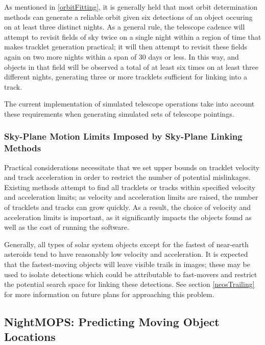 \documentclass[12pt,preprint]{aastex}
\begin{document}
As mentioned in \ref{orbitFitting}, it is generally held that most
orbit determination methods can generate a reliable orbit given six
detections of an object occuring on at least three distinct nights.
As a general rule, the telescope cadence will attempt to revisit
fields of sky twice on a single night within a region of time that
makes tracklet generation practical; it will then attempt to revisit
these fields again on two more nights within a span of 30 days or
less.  In this way, and objects in that field will be observed a total
of at least six times on at least three different nights, generating
three or more tracklets sufficient for linking into a track.


The current implementation of simulated telescope operations
take into account these requirements when generating simulated sets of
telescope pointings. 


\subsubsection{Sky-Plane Motion Limits Imposed by Sky-Plane Linking Methods}

Practical considerations necessitate that we set upper bounds on
tracklet velocity and track acceleration in order to restrict the
number of potential mislinkages. Existing methods attempt to find all
tracklets or tracks within specified velocity and acceleration limits;
as velocity and acceleration limits are raised, the number of
tracklets and tracks can grow quickly.  As a result, the choice of
velocity and acceleration limits is important, as it significantly
impacts the objects found as well as the cost of running the software.

Generally, all types of solar system objects except for the fastest of
near-earth asteroids tend to have reasonably low velocity and
acceleration. It is expected that the fastest-moving objects will
leave visible trails in images; these may be used to isolate
detections which could be attributable to fast-movers and restrict the
potential search space for linking these detections.  See section
\ref{neosTrailing} for more information on future plans for
approaching this problem.





\subsection{NightMOPS: Predicting Moving Object Locations}
\end{document}
